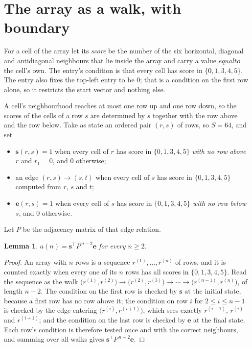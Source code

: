 \documentclass[11pt,a4paper]{article}
\theoremstyle{plain}
\newtheorem{lemma}[theorem]{Lemma}
\theoremstyle{definition}
\begin{document}
\section{The array as a walk, with boundary}

For a cell of the array let its \emph{score} be the number of the six horizontal, diagonal and antidiagonal neighbours that lie inside
the array and carry a value $equal to$ the cell's own. The entry's condition is that every cell
has score in $\{0,1,3,4,5\}$. The entry also fixes the top-left entry to be $0$; that is a condition on the first row alone, so it restricts the start vector and nothing else.

A cell's neighbourhood reaches at most one row up and one row down, so the scores of the
cells of a row $s$ are determined by $s$ together with the row above and the row below.
Take as state an ordered pair $(r,s)$ of rows, so $S=64$, and set
\begin{itemize}
\item $\mathbf{s}(r,s)=1$ when every cell of $r$ has score in $\{0,1,3,4,5\}$ \emph{with no row
above $r$} and $r_1=0$, and $0$ otherwise;
\item an edge $(r,s)\to(s,t)$ when every cell of $s$ has score in $\{0,1,3,4,5\}$ computed from
$r$, $s$ and $t$;
\item $\mathbf{e}(r,s)=1$ when every cell of $s$ has score in $\{0,1,3,4,5\}$ \emph{with no row
below $s$}, and $0$ otherwise.
\end{itemize}
Let $P$ be the adjacency matrix of that edge relation.

\begin{lemma}\label{lem:walk}
$a(n)=\mathbf{s}^{\!\top}P^{\,n-2}\mathbf{e}$ for every $n\ge2$.
\end{lemma}

\begin{proof}
An array with $n$ rows is a sequence $r^{(1)},\dots,r^{(n)}$ of rows, and it is counted
exactly when every one of its $n$ rows has all scores in $\{0,1,3,4,5\}$. Read the sequence as the
walk $\bigl(r^{(1)},r^{(2)}\bigr)\to\bigl(r^{(2)},r^{(3)}\bigr)\to\cdots\to
\bigl(r^{(n-1)},r^{(n)}\bigr)$, of length $n-2$. The condition on the first row is
checked by $\mathbf{s}$ at the initial state, because a first row has no row above it; the
condition on row $i$ for $2\le i\le n-1$ is checked by the edge entering
$\bigl(r^{(i)},r^{(i+1)}\bigr)$, which sees exactly $r^{(i-1)}$, $r^{(i)}$ and
$r^{(i+1)}$; and the condition on the last row is checked by $\mathbf{e}$ at the final
state. Each row's condition is therefore tested once and with the correct neighbours, and
summing over all walks gives $\mathbf{s}^{\!\top}P^{\,n-2}\mathbf{e}$.
\end{proof}
\end{document}
